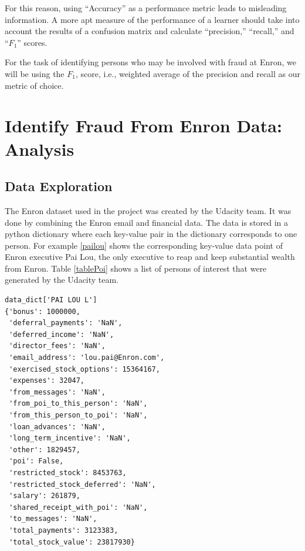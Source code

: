 \documentclass[twoside,openright,titlepage,numbers=noenddot,headinclude,%
               footinclude=true,cleardoublepage=empty,abstractoff,BCOR=5mm,%
               paper=a4,fontsize=11pt,ngerman,american]{scrreprt}
\numberwithin{theorem}{chapter}
\numberwithin{definition}{chapter}
\numberwithin{algorithm}{chapter}
\numberwithin{figure}{chapter}
\numberwithin{table}{chapter}
\numberwithin{equation}{chapter}
\begin{document}
For this reason, using ``Accuracy'' as a performance metric leads to misleading information. A more apt measure of the performance of a learner should take into account the results of a confusion matrix and  calculate ``precision,'' ``recall,'' and ``$F_1$'' scores. 

For the task of identifying persons who may be involved with fraud at Enron, we will be using the $F_1$, score, i.e., weighted average of the precision and recall as our metric of choice.



\chapter*{Identify Fraud From Enron Data: Analysis}

\section*{Data Exploration}

The Enron dataset used in the project was created by the Udacity team. It was done by combining the Enron email and financial data. The data is stored in a python dictionary where each key-value pair in the dictionary corresponds to one person. For example \ref{pailou} shows the corresponding key-value data point of Enron executive Pai Lou, the only executive to reap and keep substantial wealth from Enron. Table \ref{tablePoi} shows a list of persons of interest that were generated by the Udacity team.
\label{pailou}
\begin{verbatim}
data_dict['PAI LOU L']
{'bonus': 1000000,
 'deferral_payments': 'NaN',
 'deferred_income': 'NaN',
 'director_fees': 'NaN',
 'email_address': 'lou.pai@Enron.com',
 'exercised_stock_options': 15364167,
 'expenses': 32047,
 'from_messages': 'NaN',
 'from_poi_to_this_person': 'NaN',
 'from_this_person_to_poi': 'NaN',
 'loan_advances': 'NaN',
 'long_term_incentive': 'NaN',
 'other': 1829457,
 'poi': False,
 'restricted_stock': 8453763,
 'restricted_stock_deferred': 'NaN',
 'salary': 261879,
 'shared_receipt_with_poi': 'NaN',
 'to_messages': 'NaN',
 'total_payments': 3123383,
 'total_stock_value': 23817930}
\end{verbatim}
\end{document}
